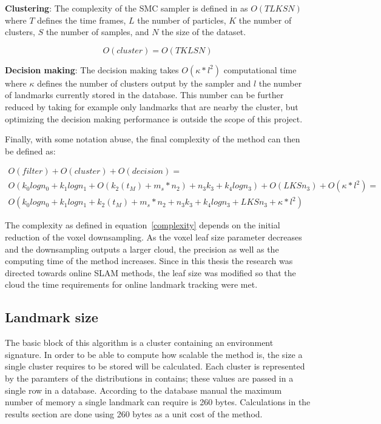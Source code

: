 \documentclass[twoside,hidelinks]{article}
\begin{document}
\textbf{Clustering}: The complexity of the SMC sampler is defined in \cite{smcddp} as $O(TLKSN)$ where $T$ defines the time frames, $L$ the number of particles, $K$ the number of clusters, $S$ the number of samples, and $N$ the size of the dataset. 

$$
O(cluster) = O(TKLSN)
$$

\textbf{Decision making}: The decision making takes $ O(\kappa * l^2) $ computational time where $\kappa$ defines the number of clusters output by the sampler and $l$ the number of landmarks currently stored in the database. This number can be further reduced by taking for example only landmarks that are nearby the cluster, but optimizing the decision making performance is outside the scope of this project.


Finally, with some notation abuse, the final complexity of the method can then be defined as:

\begin{equation} \label{complexity}
\begin{split}
O(filter) + O(cluster) + O(decision) = \\
O(k_{0}logn_{0} + k_{1}logn_{1} + O(k_{2}(t_M)+ m_s*n_{2}) + n_{3}k_{3} + k_{4}logn_{3} ) + O(LKSn_3) + O(\kappa * l^2)=\\
O(k_{0}logn_{0} + k_{1}logn_{1} + k_{2}(t_M)+ m_s*n_{2} + n_{3}k_{3} + k_{4}logn_{3} + LKSn_3 + \kappa * l^2)
\end{split}
\end{equation}

The complexity as defined in equation~\ref{complexity} depends on the initial reduction of the voxel downsampling. As the voxel leaf size parameter decreases and the downsampling outputs a larger cloud, the precision as well as the computing time of the method increases. Since in this thesis the research was directed towards online SLAM methods, the leaf size was modified so that the cloud the time requirements for online landmark tracking were met.

\subsection{Landmark size}


The basic block of this algorithm is a cluster containing an environment signature. In order to be able to compute how scalable the method is, the size a single cluster requires to be stored will be calculated. Each cluster is represented by the paramters of the distributions in contains; these values are passed in a single row in a database\cite{sqlite}. According to the database manual the maximum number of memory a single landmark can require is 260 bytes. Calculations in the results section are done using 260 bytes as a unit cost of the method. 
\end{document}
